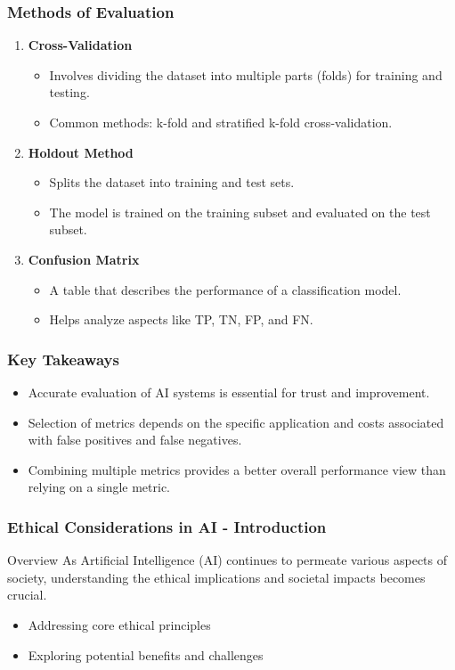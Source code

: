 \documentclass[aspectratio=169]{beamer}
\begin{document}
\begin{frame}[fragile]
    \frametitle{Methods of Evaluation}
    \begin{enumerate}
        \item \textbf{Cross-Validation}  
        \begin{itemize}
            \item Involves dividing the dataset into multiple parts (folds) for training and testing.
            \item Common methods: k-fold and stratified k-fold cross-validation.
        \end{itemize}

        \item \textbf{Holdout Method}  
        \begin{itemize}
            \item Splits the dataset into training and test sets.
            \item The model is trained on the training subset and evaluated on the test subset.
        \end{itemize}

        \item \textbf{Confusion Matrix}  
        \begin{itemize}
            \item A table that describes the performance of a classification model.
            \item Helps analyze aspects like TP, TN, FP, and FN.
        \end{itemize}
    \end{enumerate}
\end{frame}

\begin{frame}[fragile]
    \frametitle{Key Takeaways}
    \begin{itemize}
        \item Accurate evaluation of AI systems is essential for trust and improvement.
        \item Selection of metrics depends on the specific application and costs associated with false positives and false negatives.
        \item Combining multiple metrics provides a better overall performance view than relying on a single metric.
    \end{itemize}
\end{frame}

\begin{frame}[fragile]
    \frametitle{Ethical Considerations in AI - Introduction}
    \begin{block}{Overview}
        As Artificial Intelligence (AI) continues to permeate various aspects of society, understanding the ethical implications and societal impacts becomes crucial.
    \end{block}
    \begin{itemize}
        \item Addressing core ethical principles
        \item Exploring potential benefits and challenges
    \end{itemize}
\end{frame}
\end{document}
